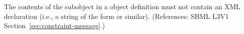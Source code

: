 The contents of the \Message subobject in a \Constraint object definition
must not contain an XML declaration (i.e., a string of the form  or similar).  (References: SBML L3V1
Section~\ref{sec:constraint-message}.)
